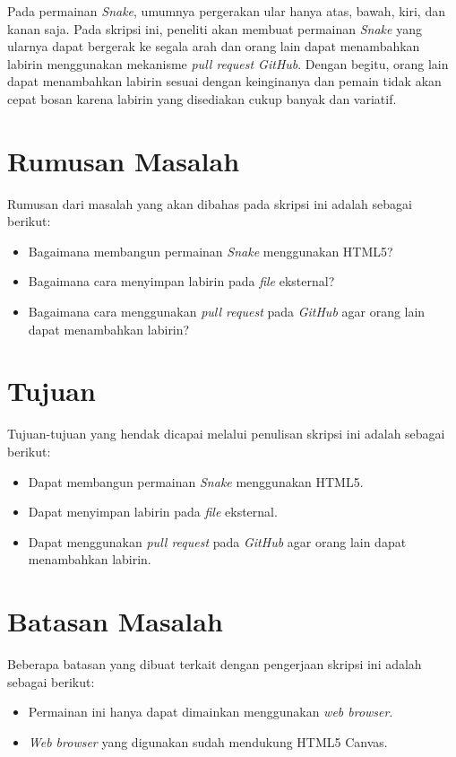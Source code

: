 Pada permainan \textit{Snake}, umumnya pergerakan ular hanya atas, bawah, kiri, dan kanan saja. Pada skripsi ini, peneliti akan membuat permainan \textit{Snake} yang ularnya dapat bergerak ke segala arah dan orang lain dapat menambahkan labirin menggunakan mekanisme \textit{pull request GitHub}. Dengan begitu, orang lain dapat menambahkan labirin sesuai dengan keinginanya dan pemain tidak akan cepat bosan karena labirin yang disediakan cukup banyak dan variatif.

\section{Rumusan Masalah}
\label{sec:rumusan}
Rumusan dari masalah yang akan dibahas pada skripsi ini adalah sebagai berikut:
\begin{itemize}
	\item Bagaimana membangun permainan \textit{Snake} menggunakan HTML5?
	\item Bagaimana cara menyimpan labirin pada \textit{file} eksternal?
	\item Bagaimana cara menggunakan \textit{pull request} pada \textit{GitHub} agar orang lain dapat menambahkan labirin?
\end{itemize}


\section{Tujuan}
\label{sec:tujuan}
Tujuan-tujuan yang hendak dicapai melalui penulisan skripsi ini adalah sebagai berikut:
\begin{itemize}
	\item Dapat membangun permainan \textit{Snake} menggunakan HTML5.
	\item Dapat menyimpan labirin pada \textit{file} eksternal.
	\item Dapat menggunakan \textit{pull request} pada \textit{GitHub} agar orang lain dapat menambahkan labirin.
\end{itemize}


\section{Batasan Masalah}
\label{sec:batasan}
Beberapa batasan yang dibuat terkait dengan pengerjaan skripsi ini adalah sebagai berikut:
\begin{itemize}
	\item Permainan ini hanya dapat dimainkan menggunakan \textit{web browser}.
	\item \textit{Web browser} yang digunakan sudah mendukung HTML5 Canvas.
\end{itemize}


